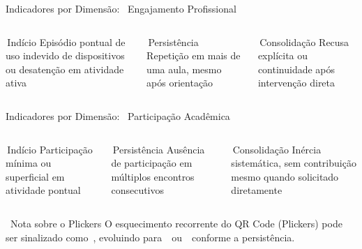 \documentclass[xcolor=dvipsnames,table]{beamer}
\newcommand{\sazul}{\textcolor{NavyBlue}{\faCircle}\,}
\newcommand{\samarelo}{\textcolor{Goldenrod}{\faCircle}\,}
\newcommand{\svermelho}{\textcolor{BrickRed}{\faCircle}\,}
\begin{document}
  \begin{frame}[t]{Indicadores por Dimensão: \faMobileAlt\ Engajamento Profissional}
    \begin{columns}
      \begin{block}{\centering \sazul Indício}
        \centering \scriptsize Episódio pontual de uso indevido de dispositivos ou desatenção em
        atividade ativa
      \end{block}
      \begin{alertblock}{\centering \samarelo Persistência}
        \centering \scriptsize Repetição em mais de uma aula, mesmo após orientação
      \end{alertblock}
      \begin{block}{\centering \svermelho Consolidação}
        \centering \scriptsize Recusa explícita ou continuidade após intervenção direta
      \end{block}
    \end{columns}
  \end{frame}

  \begin{frame}[t]{Indicadores por Dimensão: \faComments\ Participação Acadêmica}
    \begin{columns}
      \begin{block}{\centering \sazul Indício}
        \centering \scriptsize Participação mínima ou superficial em atividade pontual
      \end{block}
      \begin{alertblock}{\centering \samarelo Persistência}
        \centering \scriptsize Ausência de participação em múltiplos encontros consecutivos
      \end{alertblock}
      \begin{block}{\centering \svermelho Consolidação}
        \centering \scriptsize Inércia sistemática, sem contribuição mesmo quando solicitado
        diretamente
      \end{block}
    \end{columns}
    \pause
    \vspace{0.5em}
    \begin{exampleblock}{\faInfoCircle\ Nota sobre o Plickers}
      \scriptsize O esquecimento recorrente do QR Code (Plickers) pode ser sinalizado como
      \sazul, evoluindo para \samarelo\ ou \svermelho\ conforme a persistência.
    \end{exampleblock}
  \end{frame}
\end{document}
